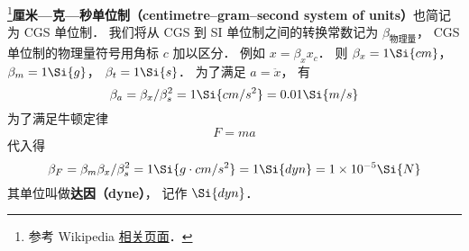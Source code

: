 
\begin{issues}
\issueDraft
\end{issues}


\footnote{参考 Wikipedia \href{https://en.wikipedia.org/wiki/Centimetre-gram-second_system_of_units}{相关页面}．}\textbf{厘米—克—秒单位制（centimetre–gram–second system of units）}也简记为 CGS 单位制． 我们将从 CGS 到 SI 单位制之间的转换常数记为 $\beta_\text{物理量}$， CGS 单位制的物理量符号用角标 $c$ 加以区分． 例如 $x = \beta_x x_c$． 则 $\beta_x = 1\Si{cm}$， $\beta_m = 1\Si{g}$， $\beta_t = 1\Si{s}$．
为了满足 $a = \ddot x$， 有
\begin{equation}
\beta_a = \beta_x/\beta_s^2 = 1\Si{cm/s^2} = 0.01 \Si{m/s}
\end{equation}
为了满足牛顿定律
\begin{equation}
F = ma
\end{equation}
代入得
\begin{equation}
\beta_F = \beta_m \beta_x/\beta_s^2 = 1\Si{g \cdot cm/s^2} = 1\Si{dyn} = 1\times 10^{-5} \Si{N}
\end{equation}
其单位叫做\textbf{达因（dyne）}， 记作 $\Si{dyn}$．
